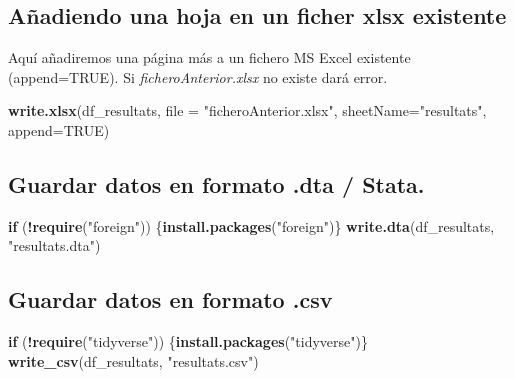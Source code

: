 \documentclass[
]{article}
\newenvironment{Shaded}{\begin{snugshade}}{\end{snugshade}}
\newcommand{\AttributeTok}[1]{\textcolor[rgb]{0.13,0.29,0.53}{#1}}
\newcommand{\ConstantTok}[1]{\textcolor[rgb]{0.56,0.35,0.01}{#1}}
\newcommand{\ControlFlowTok}[1]{\textcolor[rgb]{0.13,0.29,0.53}{\textbf{#1}}}
\newcommand{\FunctionTok}[1]{\textcolor[rgb]{0.13,0.29,0.53}{\textbf{#1}}}
\newcommand{\NormalTok}[1]{#1}
\newcommand{\SpecialCharTok}[1]{\textcolor[rgb]{0.81,0.36,0.00}{\textbf{#1}}}
\newcommand{\StringTok}[1]{\textcolor[rgb]{0.31,0.60,0.02}{#1}}
\begin{document}
\hypertarget{auxf1adiendo-una-hoja-en-un-ficher-xlsx-existente}{%
\subsection{Añadiendo una hoja en un ficher xlsx
existente}\label{auxf1adiendo-una-hoja-en-un-ficher-xlsx-existente}}

Aquí añadiremos una página más a un fichero MS Excel existente
(append=TRUE). Si \emph{ficheroAnterior.xlsx} no existe dará error.

\begin{Shaded}
\begin{Highlighting}[]
\FunctionTok{write.xlsx}\NormalTok{(df\_resultats, }\AttributeTok{file =} \StringTok{"ficheroAnterior.xlsx"}\NormalTok{, }\AttributeTok{sheetName=}\StringTok{"resultats"}\NormalTok{, }\AttributeTok{append=}\ConstantTok{TRUE}\NormalTok{)}
\end{Highlighting}
\end{Shaded}

\hypertarget{guardar-datos-en-formato-.dta-stata.}{%
\subsection{Guardar datos en formato .dta /
Stata.}\label{guardar-datos-en-formato-.dta-stata.}}

\begin{Shaded}
\begin{Highlighting}[]
\ControlFlowTok{if}\NormalTok{ (}\SpecialCharTok{!}\FunctionTok{require}\NormalTok{(}\StringTok{"foreign"}\NormalTok{)) \{}\FunctionTok{install.packages}\NormalTok{(}\StringTok{"foreign"}\NormalTok{)\}}
\FunctionTok{write.dta}\NormalTok{(df\_resultats, }\StringTok{"resultats.dta"}\NormalTok{)}
\end{Highlighting}
\end{Shaded}

\hypertarget{guardar-datos-en-formato-.csv}{%
\subsection{Guardar datos en formato
.csv}\label{guardar-datos-en-formato-.csv}}

\begin{Shaded}
\begin{Highlighting}[]
\ControlFlowTok{if}\NormalTok{ (}\SpecialCharTok{!}\FunctionTok{require}\NormalTok{(}\StringTok{"tidyverse"}\NormalTok{)) \{}\FunctionTok{install.packages}\NormalTok{(}\StringTok{"tidyverse"}\NormalTok{)\}}
\FunctionTok{write\_csv}\NormalTok{(df\_resultats, }\StringTok{"resultats.csv"}\NormalTok{)}
\end{Highlighting}
\end{Shaded}
\end{document}
